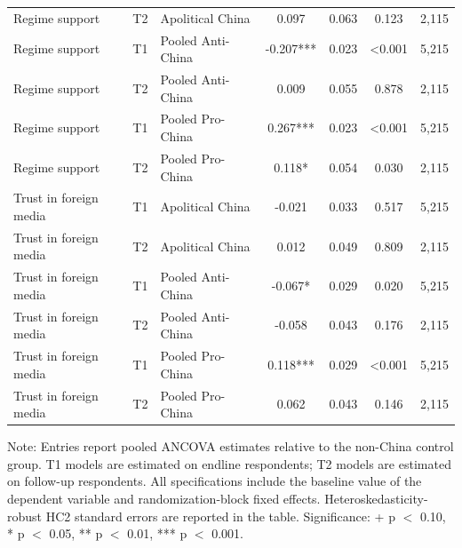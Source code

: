 \begin{table}[H]
\begin{threeparttable}
\begin{tabular}{lllcccc}
Regime support & T2 & Apolitical China & 0.097 & 0.063 & 0.123 & 2,115 \\
Regime support & T1 & Pooled Anti-China & -0.207*** & 0.023 & <0.001 & 5,215 \\
Regime support & T2 & Pooled Anti-China & 0.009 & 0.055 & 0.878 & 2,115 \\
Regime support & T1 & Pooled Pro-China & 0.267*** & 0.023 & <0.001 & 5,215 \\
Regime support & T2 & Pooled Pro-China & 0.118* & 0.054 & 0.030 & 2,115 \\
Trust in foreign media & T1 & Apolitical China & -0.021 & 0.033 & 0.517 & 5,215 \\
Trust in foreign media & T2 & Apolitical China & 0.012 & 0.049 & 0.809 & 2,115 \\
Trust in foreign media & T1 & Pooled Anti-China & -0.067* & 0.029 & 0.020 & 5,215 \\
Trust in foreign media & T2 & Pooled Anti-China & -0.058 & 0.043 & 0.176 & 2,115 \\
Trust in foreign media & T1 & Pooled Pro-China & 0.118*** & 0.029 & <0.001 & 5,215 \\
Trust in foreign media & T2 & Pooled Pro-China & 0.062 & 0.043 & 0.146 & 2,115 \\
\bottomrule
\end{tabular}
\begin{tablenotes}[flushleft]
\footnotesize
\item Note: Entries report pooled ANCOVA estimates relative to the non-China control group. T1 models are estimated on endline respondents; T2 models are estimated on follow-up respondents. All specifications include the baseline value of the dependent variable and randomization-block fixed effects. Heteroskedasticity-robust HC2 standard errors are reported in the table. Significance: + p $<$ 0.10, * p $<$ 0.05, ** p $<$ 0.01, *** p $<$ 0.001.
\end{tablenotes}
\end{threeparttable}
\end{table}
